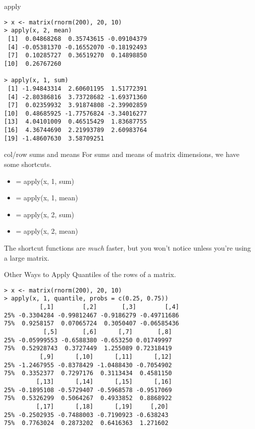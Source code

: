 \documentclass[aspectratio=169]{beamer}
\begin{document}
\begin{frame}[fragile]{apply}
\begin{verbatim}
> x <- matrix(rnorm(200), 20, 10)
> apply(x, 2, mean)
 [1]  0.04868268  0.35743615 -0.09104379
 [4] -0.05381370 -0.16552070 -0.18192493
 [7]  0.10285727  0.36519270  0.14898850
[10]  0.26767260

> apply(x, 1, sum)
 [1] -1.94843314  2.60601195  1.51772391
 [4] -2.80386816  3.73728682 -1.69371360
 [7]  0.02359932  3.91874808 -2.39902859
[10]  0.48685925 -1.77576824 -3.34016277
[13]  4.04101009  0.46515429  1.83687755
[16]  4.36744690  2.21993789  2.60983764
[19] -1.48607630  3.58709251
\end{verbatim}
\end{frame}


\begin{frame}{col/row sums and means}
For sums and means of matrix dimensions, we have some shortcuts.
\begin{itemize}
\item
{} = apply(x, 1, sum)
\item
{} = apply(x, 1, mean)
\item
{} = apply(x, 2, sum)
\item
{} = apply(x, 2, mean)
\end{itemize}
The shortcut functions are \textit{much} faster, but you won't notice
unless you're using a large matrix.
\end{frame}

\begin{frame}[fragile]{Other Ways to Apply}
Quantiles of the rows of a matrix.
\begin{verbatim}
> x <- matrix(rnorm(200), 20, 10)
> apply(x, 1, quantile, probs = c(0.25, 0.75))
          [,1]        [,2]       [,3]        [,4]
25% -0.3304284 -0.99812467 -0.9186279 -0.49711686
75%  0.9258157  0.07065724  0.3050407 -0.06585436
           [,5]       [,6]      [,7]       [,8]
25% -0.05999553 -0.6588380 -0.653250 0.01749997
75%  0.52928743  0.3727449  1.255089 0.72318419
          [,9]      [,10]      [,11]      [,12]
25% -1.2467955 -0.8378429 -1.0488430 -0.7054902
75%  0.3352377  0.7297176  0.3113434  0.4581150
         [,13]      [,14]      [,15]      [,16]
25% -0.1895108 -0.5729407 -0.5968578 -0.9517069
75%  0.5326299  0.5064267  0.4933852  0.8868922
         [,17]      [,18]      [,19]     [,20]
25% -0.2502935 -0.7488003 -0.7190923 -0.638243
75%  0.7763024  0.2873202  0.6416363  1.271602
\end{verbatim}
\end{frame}
\end{document}
